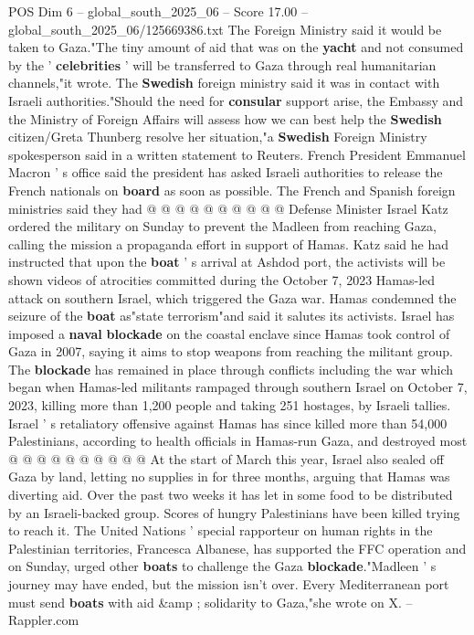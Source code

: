 \begin{textsample}{POS Dim 6 – global\_south\_2025\_06 – Score 17.00 – global\_south\_2025\_06/125669386.txt}
The Foreign Ministry said it would be taken to Gaza."The tiny amount of aid that was on the \textbf{yacht} and not consumed by the ' \textbf{celebrities} ' will be transferred to Gaza through real humanitarian channels,"it wrote.
The \textbf{Swedish} foreign ministry said it was in contact with Israeli authorities."Should the need for \textbf{consular} support arise, the Embassy and the Ministry of Foreign Affairs will assess how we can best help the \textbf{Swedish} citizen/Greta Thunberg resolve her situation,"a \textbf{Swedish} Foreign Ministry spokesperson said in a written statement to Reuters.
French President Emmanuel Macron ' s office said the president has asked Israeli authorities to release the French nationals on \textbf{board} as soon as possible.
The French and Spanish foreign ministries said they had @ @ @ @ @ @ @ @ @ @ Defense Minister Israel Katz ordered the military on Sunday to prevent the Madleen from reaching Gaza, calling the mission a propaganda effort in support of Hamas.
Katz said he had instructed that upon the \textbf{boat} ' s arrival at Ashdod port, the activists will be shown videos of atrocities committed during the October 7, 2023 Hamas-led attack on southern Israel, which triggered the Gaza war.
Hamas condemned the seizure of the \textbf{boat} as"state terrorism"and said it salutes its activists.
Israel has imposed a \textbf{naval} \textbf{blockade} on the coastal enclave since Hamas took control of Gaza in 2007, saying it aims to stop weapons from reaching the militant group.
The \textbf{blockade} has remained in place through conflicts including the war which began when Hamas-led militants rampaged through southern Israel on October 7, 2023, killing more than 1,200 people and taking 251 hostages, by Israeli tallies.
Israel ' s retaliatory offensive against Hamas has since killed more than 54,000 Palestinians, according to health officials in Hamas-run Gaza, and destroyed most @ @ @ @ @ @ @ @ @ @ At the start of March this year, Israel also sealed off Gaza by land, letting no supplies in for three months, arguing that Hamas was diverting aid.
Over the past two weeks it has let in some food to be distributed by an Israeli-backed group.
Scores of hungry Palestinians have been killed trying to reach it.
The United Nations ' special rapporteur on human rights in the Palestinian territories, Francesca Albanese, has supported the FFC operation and on Sunday, urged other \textbf{boats} to challenge the Gaza \textbf{blockade}."Madleen ' s journey may have ended, but the mission isn't over.
Every Mediterranean port must send \textbf{boats} with aid \&amp ; solidarity to Gaza,"she wrote on X. -- Rappler.com

\end{textsample}
